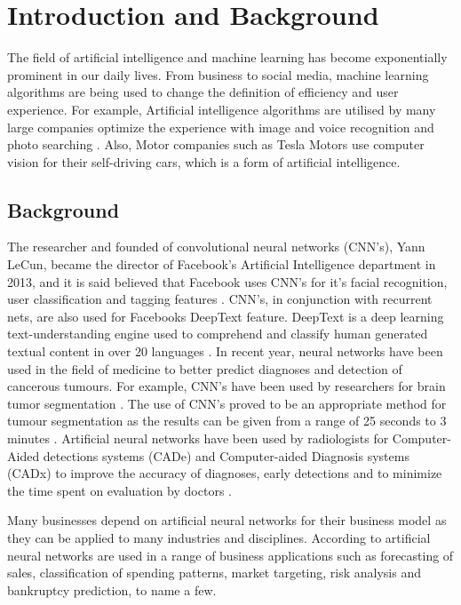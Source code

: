 

\chapter{Introduction and Background} 
The field of artificial intelligence and machine learning has become exponentially prominent in our daily lives.
From business to social media, machine learning algorithms are being used to change the definition of efficiency and user experience.
For example, Artificial intelligence algorithms are utilised by many large companies optimize the experience with image and voice recognition and photo searching \citep{adit}. Also, Motor companies such as Tesla Motors use computer vision for their self-driving cars, which is a form of artificial intelligence. 
\section{Background}
The researcher and founded of convolutional neural networks (CNN's), Yann LeCun, became the director of Facebook's Artificial Intelligence department in 2013, and it is said believed that Facebook uses CNN's for it's facial recognition, user classification and tagging features \citep{adit}. CNN's, in conjunction with recurrent nets, are also used for Facebooks DeepText feature. DeepText is a deep learning text-understanding engine used to comprehend and classify human generated textual content in over 20 languages \citep{DeepText}.
In recent year, neural networks have been used in the field of medicine to better predict diagnoses and detection of cancerous tumours. For example, CNN's have been used by researchers for brain tumor segmentation \citep{DBLP}. The use of CNN's proved to be an appropriate method for tumour segmentation as the results can be given from a range of 25 seconds to 3 minutes \citep{DBLP}. Artificial neural networks have been used by radiologists for Computer-Aided detections systems (CADe) and Computer-aided Diagnosis systems (CADx) to improve the accuracy of diagnoses, early detections and to minimize the time spent on evaluation by doctors \citep{CADe}. 

Many businesses depend on artificial neural networks for their business model as they can be applied to many industries and disciplines. According to \citet{geocities}
artificial neural networks are used in a range of business applications such as forecasting of sales, classification of spending patterns, market targeting, risk analysis and bankruptcy prediction, to name a few.


